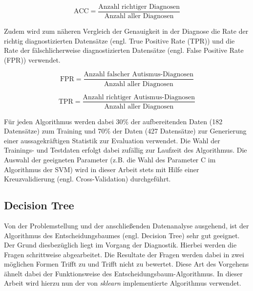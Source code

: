 \documentclass[conference]{IEEEtran}
\begin{document}
\begin{equation} \label{math:accuracy}
\text{ACC} = \frac{\text{Anzahl richtiger Diagnosen}}{\text{Anzahl aller Diagnosen}}
\end{equation}

Zudem wird zum näheren Vergleich der Genauigkeit in der Diagnose die Rate der richtig diagnostizierten Datensätze (engl. \glqq True Positive Rate\grqq{} (TPR)) und die Rate der fälschlicherweise diagnostizierten Datensätze (engl. \glqq False Positive Rate\grqq{} (FPR)) verwendet.

\begin{equation} \label{math:fpr}
\text{FPR} = \frac{\text{Anzahl falscher Autismus-Diagnosen}}{\text{Anzahl aller Diagnosen}}
\end{equation}

\begin{equation} \label{math:tpr}
\text{TPR} = \frac{\text{Anzahl richtiger Autismus-Diagnosen}}{\text{Anzahl aller Diagnosen}}
\end{equation}

Für jeden Algorithmus werden dabei 30\% der aufbereitenden Daten (182 Datensätze) zum Training und 70\%  der Daten (427 Datensätze) zur Generierung einer aussagekräftigen Statistik zur Evaluation verwendet. Die Wahl der Trainings- und Testdaten erfolgt dabei zufällig zur Laufzeit des Algorithmus.
Die Auswahl der geeigneten Parameter (z.B. die Wahl des Parameter C im Algorithmus der SVM) wird in dieser Arbeit stets mit Hilfe einer Kreuzvalidierung (engl. \glqq Cross-Validation\grqq{}) durchgeführt.

\subsection{Decision Tree} \label{sec:tree}
Von der Problemstellung und der anschließenden Datenanalyse ausgehend, ist der Algorithmus des Entscheidungsbaumes (engl. \glqq Decision Tree\grqq) sehr gut geeignet. Der Grund diesbezüglich liegt im Vorgang der Diagnostik. Hierbei werden die Fragen schrittweise abgearbeitet. Die Resultate der Fragen werden dabei in zwei möglichen Formen \glqq Trifft zu\grqq{} und \glqq Trifft nicht zu\grqq{} bewertet. Diese Art des Vorgehens ähnelt dabei der Funktionsweise des Entscheidungsbaum-Algorithmus. In dieser Arbeit wird hierzu nun der von \textit{sklearn} implementierte Algorithmus verwendet. %
\end{document}
